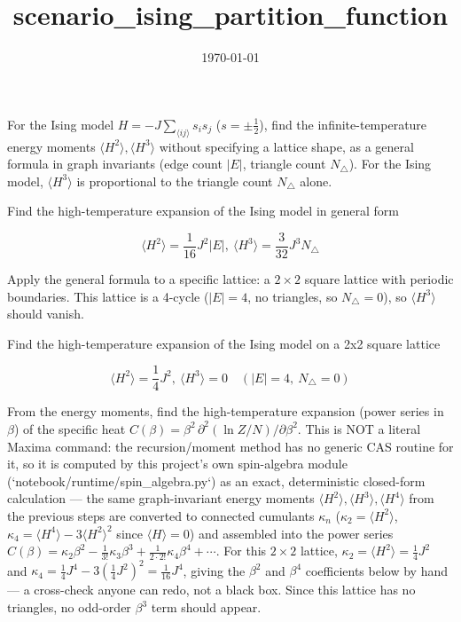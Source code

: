 \documentclass[dvipdfmx]{article}
\title{scenario\_ising\_partition\_function}
\date{\today}
\begin{document}
\maketitle

For the Ising model $H=-J\sum_{\langle ij\rangle}s_is_j$ ($s=\pm\frac12$), find the infinite-temperature energy moments $\langle H^2\rangle,\langle H^3\rangle$ without specifying a lattice shape, as a general formula in graph invariants (edge count $|E|$, triangle count $N_\triangle$). For the Ising model, $\langle H^3\rangle$ is proportional to the triangle count $N_\triangle$ alone.

Find the high-temperature expansion of the Ising model in general form

\begin{equation}
  \langle H^2 \rangle = \frac{1}{16} J^{2} |E|,\ \langle H^3 \rangle = \frac{3}{32} J^{3} N_\triangle
  \label{eq:E1}
\end{equation}

Apply the general formula to a specific lattice: a $2\times2$ square lattice with periodic boundaries. This lattice is a 4-cycle ($|E|=4$, no triangles, so $N_\triangle=0$), so $\langle H^3\rangle$ should vanish.

Find the high-temperature expansion of the Ising model on a 2x2 square lattice

\begin{equation}
  \langle H^2 \rangle = \frac{1}{4} J^{2},\ \langle H^3 \rangle = 0 \quad (|E| = 4,\ N_\triangle = 0)
  \label{eq:E2}
\end{equation}

From the energy moments, find the high-temperature expansion (power series in $\beta$) of the specific heat $C(\beta)=\beta^2\,\partial^2(\ln Z/N)/\partial\beta^2$. This is NOT a literal Maxima command: the recursion/moment method has no generic CAS routine for it, so it is computed by this project's own spin-algebra module (`notebook/runtime/spin\_algebra.py`) as an exact, deterministic closed-form calculation — the same graph-invariant energy moments $\langle H^2\rangle,\langle H^3\rangle,\langle H^4\rangle$ from the previous steps are converted to connected cumulants $\kappa_n$ ($\kappa_2=\langle H^2\rangle$, $\kappa_4=\langle H^4\rangle-3\langle H^2\rangle^2$ since $\langle H\rangle=0$) and assembled into the power series $C(\beta)=\kappa_2\beta^2-\tfrac1{3!}\kappa_3\beta^3+\tfrac1{2\cdot2!}\kappa_4\beta^4+\cdots$. For this $2\times2$ lattice, $\kappa_2=\langle H^2\rangle=\tfrac14J^2$ and $\kappa_4=\tfrac14J^4-3(\tfrac14J^2)^2=\tfrac1{16}J^4$, giving the $\beta^2$ and $\beta^4$ coefficients below by hand — a cross-check anyone can redo, not a black box. Since this lattice has no triangles, no odd-order $\beta^3$ term should appear.
\end{document}
